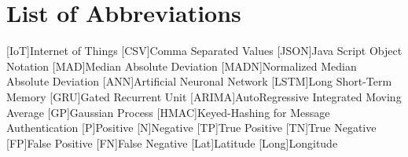 \newpage





\newpage
\listoffigures


\newpage
\listoftables
\clearpage

\renewcommand\listoflistingscaption{List of source codes}
\listoflistings
\clearpage


{}
\chapter*{List of Abbreviations}
\begin{acronym}%
	[IoT]{Internet of Things}
	[CSV]{Comma Separated Values }
	[JSON]{Java Script Object Notation}
	[MAD]{Median Absolute Deviation}
	[MADN]{Normalized Median Absolute Deviation}
	[ANN]{Artificial Neuronal Network}
	[LSTM]{Long Short-Term Memory}
	[GRU]{Gated Recurrent Unit}
	[ARIMA]{AutoRegressive Integrated Moving Average}
	[GP]{Gaussian Process}
	[HMAC]{Keyed-Hashing for Message Authentication}
	{Positive}
	{Negative}
	[TP]{True Positive}
	[TN]{True Negative}
	[FP]{False Positive}
	[FN]{False Negative}
	[Lat]{Latitude}
	[Long]{Longitude}
\end{acronym}
